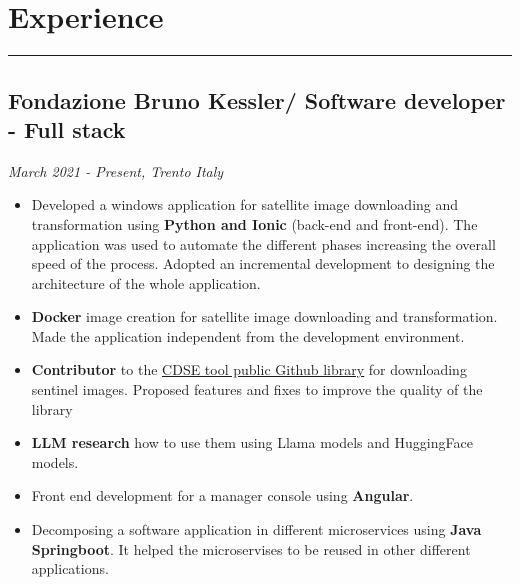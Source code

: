 \documentclass[a4paper,10pt]{article}
\begin{document}
\begin{minipage}[t]{0.25\textwidth}
    \section*{Experience}
    \vspace{10.2cm} %
    \rule{0.6cm}{0.3mm}
\end{minipage}
\hfill
\begin{minipage}[t]{0.75\textwidth}
     \subsection*{Fondazione Bruno Kessler/ Software developer - Full stack}
    \textit{ March 2021 - Present, Trento Italy  } \\
    \begin{itemize}[leftmargin=1cm]
        \item Developed a windows application for satellite image downloading and transformation using \textbf{Python and Ionic} (back-end and front-end). The application was used to automate the different phases increasing the overall speed of the process. Adopted an incremental development to designing the architecture of the whole application. 
        \item \textbf{Docker} image creation for satellite image downloading and transformation. Made the application independent from the development environment.
        \item \textbf{Contributor} to the  \textcolor{blue}{\uline{\href{https://github.com/CDSETool/CDSETool}{CDSE tool public Github library}}} for downloading sentinel images. Proposed features and fixes to improve the quality of the library
        \item \textbf{LLM research} how to use them using Llama models and HuggingFace models.
        \item Front end development for a manager console using \textbf{Angular}. 
        \item Decomposing a software application in different microservices using \textbf{Java Springboot}. It helped the microservises to be reused in other different applications.
    \end{itemize}
    \vspace{0.2cm} %

\end{minipage}
\end{document}
